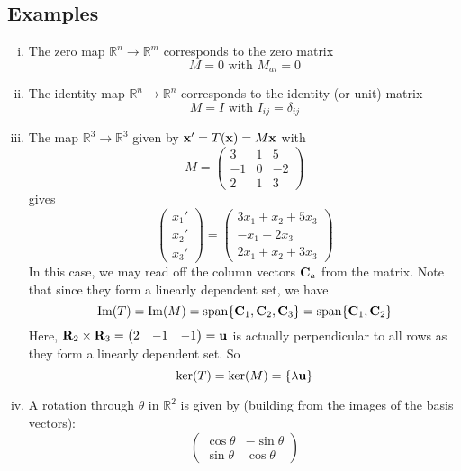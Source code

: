 \subsection{Examples}
\begin{enumerate}[(i)]
	\item The zero map \(\mathbb R^n \to \mathbb R^m\) corresponds to the zero matrix
	      \[
		      M = 0 \text{ with } M_{ai} = 0
	      \]
	\item The identity map \(\mathbb R^n \to \mathbb R^n\) corresponds to the identity (or unit) matrix
	      \[
		      M = I \text{ with } I_{ij} = \delta_{ij}
	      \]
	\item The map \(\mathbb R^3 \to \mathbb R^3\) given by \(\vb x' = T(\vb x) = M\vb x\) with
	      \[
		      M = \begin{pmatrix}
			      3  & 1 & 5  \\
			      -1 & 0 & -2 \\
			      2  & 1 & 3
		      \end{pmatrix}
	      \]
	      gives
	      \[
		      \begin{pmatrix}
			      x_1' \\ x_2' \\ x_3'
		      \end{pmatrix}
		      =
		      \begin{pmatrix}
			      3x_1 + x_2 + 5x_3 \\
			      -x_1 - 2x_3       \\
			      2x_1 + x_2 + 3x_3
		      \end{pmatrix}
	      \]
	      In this case, we may read off the column vectors \(\vb C_a\) from the matrix.
	      Note that since they form a linearly dependent set, we have
	      \[
		      \Im(T) = \Im(M) = \operatorname{span} \{ \vb C_1, \vb C_2, \vb C_3 \} = \operatorname{span} \{ \vb C_1, \vb C_2 \}
	      \]
	      Here, \(\vb R_2 \times \vb R_3 = \begin{pmatrix}
		      2 & -1 & -1
	      \end{pmatrix} = \vb u\) is actually perpendicular to all rows as they form a linearly dependent set.
	      So
	      \[
		      \ker(T) = \ker(M) = \{ \lambda \vb u \}
	      \]
	\item A rotation through \(\theta\) in \(\mathbb R^2\) is given by (building from the images of the basis vectors):
	      \[
		      \begin{pmatrix}
			      \cos \theta & -\sin \theta \\
			      \sin \theta & \cos \theta
		      \end{pmatrix}
\]
\end{enumerate}
